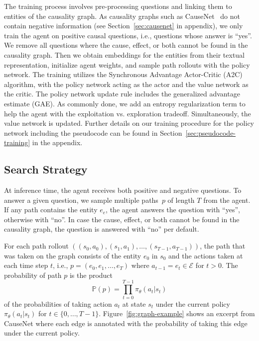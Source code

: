 The training process involves pre-processing questions and linking them to entities of the causality graph. As causality graphs such as CauseNet~\cite{Heindorf2020Causenet} do not contain negative information (see Section~\ref{sec:causenet} in appendix), we only train the agent on positive causal questions, i.e., questions whose answer is ``yes''. We remove all questions where the cause, effect, or both cannot be found in the causality graph. Then we obtain embeddings for the entities from their textual representation, initialize agent weights, and sample path rollouts with the policy network. The training utilizes the Synchronous Advantage Actor-Critic (A2C) algorithm, with the policy network acting as the actor and the value network as the critic. The policy network update rule includes the generalized advantage estimate (GAE). As commonly done, we add an entropy regularization term to help the agent with the exploitation vs. exploration tradeoff. Simultaneously, the value network is updated. Further details on our training procedure for the policy network including the pseudocode can be found in Section~\ref{sec:pseudocode-training} in the appendix.


\subsection{Search Strategy}
\label{subsec:search}
At inference time, the agent receives both positive and negative questions. To answer a given question, we sample multiple paths~$p$ of length $T$ from the agent. If any path contains the entity $e_e$, the agent answers the question with ``yes'', otherwise with ``no''. In case the cause, effect, or both cannot be found in the causality graph, the question is answered with ``no'' per default.

For each path rollout $((s_0, a_0),(s_1, a_1), \dots, (s_{T-1}, a_{T-1}))$, the path that was taken on the graph consists of the entity $e_0$ in $s_0$ and the actions taken at each time step $t$, i.e., $p = (e_0, e_1,\dots, e_T)$ where $a_{t-1} = e_t \in \mathcal{E}$ for $t > 0$. The probability of path $p$ is the product
\begin{equation}
  \mathbb{P}(p) = \prod_{t=0}^{T-1} \pi_{\theta}(a_t |s_t)
  \label{eq:decoding}
\end{equation}
of the probabilities of taking action $a_t$ at state $s_t$ under the current policy $\pi_{\theta}(a_t | s_t)$ for $t \in \{0,\dots,T-1\}$. Figure~\ref{fig:graph-example} shows an excerpt from CauseNet where each edge is annotated with the probability of taking this edge under the current policy.

